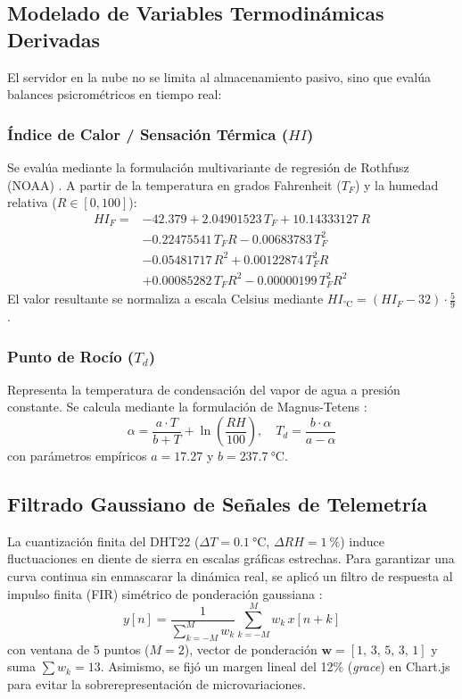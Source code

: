 \documentclass[conference]{IEEEtran}
\begin{document}
\subsection{Modelado de Variables Termodinámicas Derivadas}
El servidor en la nube no se limita al almacenamiento pasivo, sino que evalúa balances psicrométricos en tiempo real:

\subsubsection{\texorpdfstring{Índice de Calor / Sensación Térmica ($HI$)}{Índice de Calor (HI)}}
Se evalúa mediante la formulación multivariante de regresión de Rothfusz (NOAA) \cite{rothfusz1990}. A partir de la temperatura en grados Fahrenheit ($T_F$) y la humedad relativa ($R \in [0, 100]$):
\begin{align}
    HI_F = &-42.379 + 2.04901523\,T_F + 10.14333127\,R \nonumber \\
           &- 0.22475541\,T_F R - 0.00683783\,T_F^2 \nonumber \\
           &- 0.05481717\,R^2 + 0.00122874\,T_F^2 R \nonumber \\
           &+ 0.00085282\,T_F R^2 - 0.00000199\,T_F^2 R^2
    \label{eq:heat_index}
\end{align}
El valor resultante se normaliza a escala Celsius mediante $HI_{\si{\celsius}} = (HI_F - 32) \cdot \frac{5}{9}$.

\subsubsection{\texorpdfstring{Punto de Rocío ($T_d$)}{Punto de Rocío (Td)}}
Representa la temperatura de condensación del vapor de agua a presión constante. Se calcula mediante la formulación de Magnus-Tetens \cite{alduchov1996}:
\begin{equation}
    \alpha = \frac{a \cdot T}{b + T} + \ln\left(\frac{RH}{100}\right), \quad T_d = \frac{b \cdot \alpha}{a - \alpha}
    \label{eq:dew_point}
\end{equation}
con parámetros empíricos $a = 17.27$ y $b = \SI{237.7}{\celsius}$.

\subsection{Filtrado Gaussiano de Señales de Telemetría}
La cuantización finita del DHT22 ($\Delta T = \SI{0.1}{\celsius}$, $\Delta RH = \SI{1}{\percent}$) induce fluctuaciones en diente de sierra en escalas gráficas estrechas. Para garantizar una curva continua sin enmascarar la dinámica real, se aplicó un filtro de respuesta al impulso finita (FIR) simétrico de ponderación gaussiana \cite{oppenheim1999}:
\begin{equation}
    y[n] = \frac{1}{\sum_{k=-M}^{M} w_k} \sum_{k=-M}^{M} w_k \, x[n+k]
    \label{eq:gauss_filter}
\end{equation}
con ventana de 5 puntos ($M=2$), vector de ponderación $\mathbf{w} = [1, \, 3, \, 5, \, 3, \, 1]$ y suma $\sum w_k = 13$. Asimismo, se fijó un margen lineal del 12\% (\textit{grace}) en Chart.js para evitar la sobrerepresentación de microvariaciones.
\end{document}
